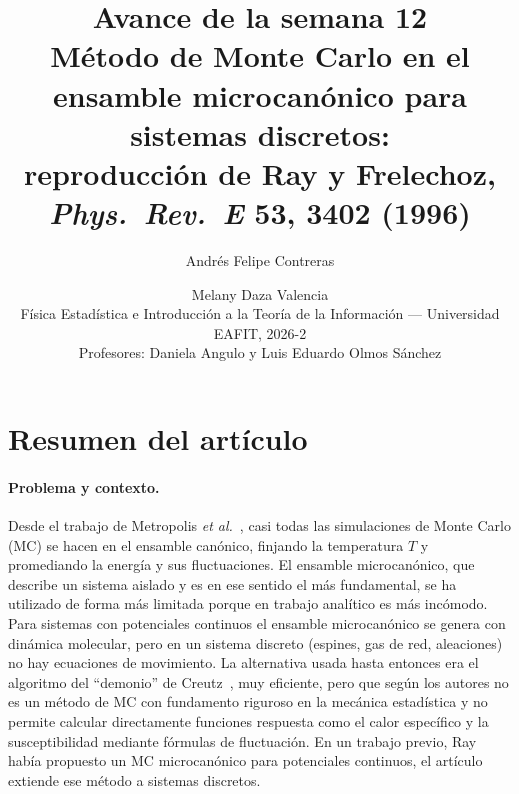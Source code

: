 \documentclass[11pt,letterpaper]{article}
\title{\textbf{Avance de la semana 12}\\[4pt]
\large Método de Monte Carlo en el ensamble microcanónico para sistemas discretos:\\
reproducción de Ray y Frelechoz, \textit{Phys.\ Rev.\ E} \textbf{53}, 3402 (1996)}
\author{Andrés Felipe Contreras \and Melany Daza Valencia\\[4pt]
\small Física Estadística e Introducción a la Teoría de la Información --- Universidad EAFIT, 2026-2\\
\small Profesores: Daniela Angulo y Luis Eduardo Olmos Sánchez}
\date{}
\begin{document}
\maketitle


\section{Resumen del artículo}

\paragraph{Problema y contexto.}
Desde el trabajo de Metropolis \emph{et al.}~\cite{metropolis53}, casi todas las
simulaciones de Monte Carlo (MC) se hacen en el ensamble canónico, finjando la
temperatura $T$ y promediando la energía y sus fluctuaciones. El ensamble
microcanónico, que describe un sistema aislado y es en ese sentido el más
fundamental, se ha utilizado de forma más limitada porque en trabajo analítico es más incómodo.
Para sistemas con potenciales continuos el ensamble microcanónico se genera con
dinámica molecular, pero en un sistema discreto (espines, gas de red, aleaciones)
no hay ecuaciones de movimiento. La alternativa usada hasta entonces era el
algoritmo del ``demonio'' de Creutz~\cite{creutz83}, muy eficiente, pero que según
los autores no es un método de MC con fundamento riguroso en la mecánica
estadística y no permite calcular directamente funciones respuesta como el calor
específico y la susceptibilidad mediante fórmulas de fluctuación. En un trabajo
previo, Ray~\cite{ray91} había propuesto un MC microcanónico para potenciales
continuos, el artículo extiende ese método a sistemas discretos.
\end{document}
